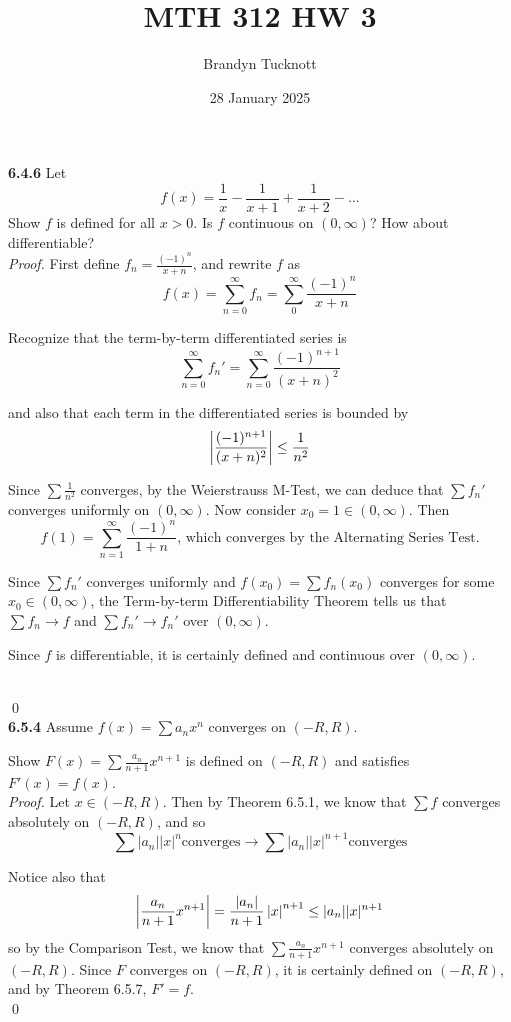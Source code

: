\documentclass{exam}
\title{MTH 312 HW 3}
\author{Brandyn Tucknott}
\date{28 January 2025}
\begin{document}
\maketitle

\begin{questions}
    \textbf{6.4.6 }
Let
$$f(x) = \frac{1}{x} - \frac{1}{x + 1} + \frac{1}{x + 2} - ...$$
Show $f$ is defined for all $x > 0$. Is $f$ continuous on $(0, \infty)$? How about differentiable? \\

\textit{Proof. }
    First define $f_n = \frac{(-1)^n}{x + n}$, and rewrite $f$ as
    $$f(x) = \sum_{n = 0}^\infty f_n = \sum_0^\infty \frac{(-1)^n}{x + n}$$

    Recognize that the term-by-term differentiated series is
    $$\sum_{n = 0}^\infty f_n' = \sum_{n = 0}^\infty \frac{(-1)^{n+1}}{(x+n)^2}$$

    and also that each term in the differentiated series is bounded by
    $$\left| \frac{(-1)^{n + 1}}{(x + n)^2} \right| \leq \frac{1}{n^2}$$

    Since $\sum \frac{1}{n^2}$ converges, by the Weierstrauss M-Test, we can deduce that $\sum f_n'$ converges uniformly on $(0, \infty)$. Now consider $x_0 = 1 \in (0, \infty)$. Then
    $$f(1) = \sum_{n = 1}^\infty \frac{(-1)^n}{1 + n}\text{, which converges by the Alternating Series Test.}$$

    Since $\sum f_n'$ converges uniformly and $f(x_0) = \sum f_n(x_0)$ converges for some $x_0 \in (0, \infty)$, the Term-by-term Differentiability Theorem tells us that $\sum f_n \rightarrow f$ and $\sum f_n' \rightarrow f_n'$ over $(0, \infty)$.

    Since $f$ is differentiable, it is certainly defined and continuous over $(0, \infty)$.
    

    \\ \qed \\

\newpage
\textbf{6.5.4 }
Assume $f(x) = \sum a_nx^n$ converges on $(-R, R)$.


Show $F(x) = \sum \frac{a_n}{n + 1}x^{n + 1}$ is defined on $(-R, R)$ and satisfies $F'(x) = f(x)$. \\
\textit{Proof. }
Let $x \in (-R, R)$. Then by Theorem 6.5.1, we know that $\sum f$ converges absolutely on $(-R, R)$, and so
$$\sum |a_n||x|^n \text{converges} \longrightarrow \sum|a_n||x|^{n + 1} \text{converges}$$

Notice also that
$$\left| \frac{a_n}{n + 1}x^{n + 1} \right| = \frac{|a_n|}{n + 1}\left| x \right|^{n + 1}\leq |a_n||x|^{n + 1}$$
so by the Comparison Test, we know that $\sum \frac{a_n}{n + 1}x^{n + 1}$ converges absolutely on $(-R, R)$. Since $F$ converges on $(-R, R)$, it is certainly defined on $(-R, R)$, and by Theorem 6.5.7, $F' = f$.
\\ \qed \\


\end{questions}
\end{document}
